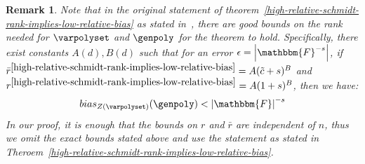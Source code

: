 \documentclass[10pt,a4paper]{article}
\newtheorem{remark}[theorem]{Remark}
\newcommand{\parens}[1]{\left( #1 \right)}
\newcommand{\basefield}[0]{\mathbbm{F}}
\newcommand{\blocklength}[0]{n}
\newcommand{\degree}[0]{d}
\newcommand{\varietypolycount}{{\tilde{c}}}
\newcommand{\zerofunc}[1]{Z \parens{#1}}
\newcommand{\rankval}[0]{{{r}}}
\newcommand{\varietyrankval}[0]{{\bar{r}}}
\newcommand{\relbias}[2]{bias_{#1}{({#2})}}
\newcommand{\abs}[1]{\left| #1 \right|}
\begin{document}
\begin{remark}
    Note that in the original statement of theorem~\ref{high-relative-schmidt-rank-implies-low-relative-bias} as stated in~\cite[Theorem 1.8]{lampert2021relative},
    there are good bounds on the rank needed for $\varpolyset$ and $\genpoly$ for the theorem to hold.
    \newline
    Specifically, there exist constants $A(\degree), B(\degree)$ such that for an error $\epsilon = \abs{\basefield^{-s}}$,
    if $\varietyrankval^{\ref{high-relative-schmidt-rank-implies-low-relative-bias}} = A(\varietypolycount + s)^B$ and $\rankval^{\ref{high-relative-schmidt-rank-implies-low-relative-bias}} = A(1 + s)^B$,
    then we have:
    \[
        \relbias{\zerofunc{\varpolyset}}{\genpoly} < \abs{\basefield}^{-s}
    \]
    \newline
    In our proof, it is enough that the bounds on $\rankval$ and $\varietyrankval$ are independent of $\blocklength$, thus we omit the exact bounds stated above and use the statement as stated in Theroem~\ref{high-relative-schmidt-rank-implies-low-relative-bias}.
\end{remark}
\end{document}
